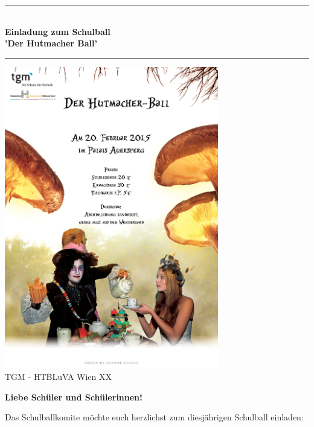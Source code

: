 \documentclass[12pt]{article}
\author{RoboNav}
\date{\today}
\begin{document}
\begin{titlepage}
\begin{center}

\rule{1.0\textwidth}{1mm}
{ \huge \bfseries \\[0.4cm]  \huge Einladung zum Schulball \\ \LARGE 'Der Hutmacher Ball' \\[0.4cm] }

\rule{1.0\textwidth}{1mm}
\vspace{0.5cm}

\includegraphics[width=0.7\textwidth]{versionbright_small}\\  

\small TGM - HTBLuVA Wien XX \\ [1.5cm]

\end{center}
\end{titlepage} 
\begin{center}
\textbf{Liebe Schüler und Schülerinnen!}
\end{center}
\vspace{0.5cm}
Das Schulballkomite möchte euch herzlichst zum diesjährigen Schulball einladen: \\
\end{document}
